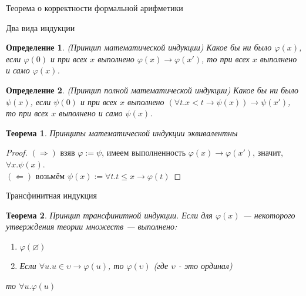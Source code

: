 \documentclass[aspectratio=169]{beamer}
\newtheorem{thm}{Теорема}[section]
\newtheorem{dfn}{Определение}[section]
\begin{document}
\newcommand\doubleplus{+\kern-1.3ex+\kern0.8ex}
\newcommand\mdoubleplus{\ensuremath{\mathbin{+\mkern-10mu+}}}

\begin{frame}{}
\LARGE\begin{center}Теорема о корректности формальной арифметики\end{center}
\end{frame}

\begin{frame}{Два вида индукции}
\begin{dfn}\emph{(Принцип математической индукции)}
Какое бы ни было $\varphi(x)$, если $\varphi(0)$ и при всех $x$ выполнено $\varphi(x)\rightarrow \varphi(x')$, то
при всех $x$ выполнено и само $\varphi(x)$.
\end{dfn}

\begin{dfn}\emph{(Принцип полной математической индукции)}
Какое бы ни было $\psi(x)$, если $\psi(0)$ и при всех $x$ выполнено $(\forall t.x < t \rightarrow \psi(x))\rightarrow \psi(x')$, то
при всех $x$ выполнено и само $\psi(x)$.
\end{dfn}

\begin{thm}Принципы математической индукции эквивалентны\end{thm}
\begin{proof}
$(\Rightarrow)$ взяв $\varphi := \psi$, имеем выполненность $\varphi(x)\rightarrow\varphi(x')$, значит, $\forall x.\psi(x)$. \pause\\
$(\Leftarrow)$ возьмём $\psi(x) := \forall t.t\le x\rightarrow\varphi(t)$
\end{proof}
\end{frame}

\begin{frame}{Трансфинитная индукция}
\begin{thm}Принцип трансфинитной индукции. Если для $\varphi(x)$ --- некоторого утверждения
теории множеств --- выполнено:
\begin{enumerate}
\item $\varphi(\varnothing)$
\item Если $\forall u.u \in \upsilon \rightarrow \varphi(u)$, то $\varphi(\upsilon)$ (где $\upsilon$ - это ординал)
\end{enumerate}
то $\forall u.\varphi(u)$
\end{thm}
\end{frame}
\end{document}
